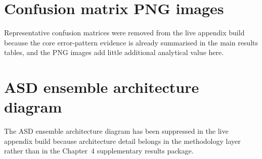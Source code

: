 \section{Confusion matrix PNG images}
\label{sec:appendix_ch4_s3}

\noindent Representative confusion matrices were removed from the live appendix build because the core error-pattern evidence is already summarised in the main results tables, and the PNG images add little additional analytical value here.

\label{fig:cm_asd}
\label{fig:cm_pd}
\label{fig:cm_stress}

\section{ASD ensemble architecture diagram}
\label{sec:appendix_ch4_s4}

\noindent The ASD ensemble architecture diagram has been suppressed in the live appendix build because architecture detail belongs in the methodology layer rather than in the Chapter~4 supplementary results package.

\label{fig:msca_architecture}

